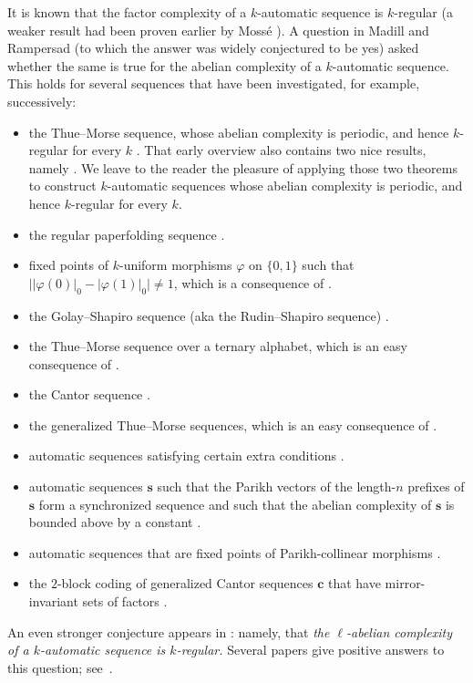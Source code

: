 \documentclass[12pt]{article}
\theoremstyle{plain}
\theoremstyle{definition}
\theoremstyle{remark}
\numberwithin{equation}{section}
\begin{document}
It is known that the factor complexity of a $k$-automatic 
sequence is $k$-regular \cite[Prop.~4.3]{Carpi-D-Alonzo}
(a weaker result had been proven earlier by Moss\'e \cite{Mosse}).
A question in Madill and Rampersad \cite{MadillRampersad} (to which the answer 
was widely conjectured to be yes) asked whether the same 
is true for the abelian complexity of a $k$-automatic 
sequence.  
This holds for several sequences that 
have been investigated, for example, successively:
\begin{itemize}
    \item the Thue--Morse sequence, whose abelian complexity is periodic, and hence $k$-regular for every $k$ 
    \cite[Thm.~3.1]{Richomme&Saari&Zamboni:2011}. That
    early overview also contains two nice results, namely
    \cite[Thm.~1.7 and Thm.~3.3]{Richomme&Saari&Zamboni:2011}. We leave to the reader the
    pleasure of applying those two theorems to construct
    $k$-automatic sequences whose abelian complexity is
    periodic, and hence $k$-regular for every $k$.
    \item the regular paperfolding sequence \cite{MadillRampersad}.
    \item fixed points of $k$-uniform morphisms 
    $\varphi$ on $\{0, 1\}$ such that 
    $\big|\lvert\varphi(0)\rvert_0 - \lvert\varphi(1)\rvert_0\big|\neq 1$, which is a consequence of \cite[Cor.~1]{BSSW}.
    \item the Golay--Shapiro sequence (aka the Rudin--Shapiro sequence) \cite{LCWW}.
    \item the Thue--Morse sequence over a ternary alphabet, which is an easy consequence of \cite[Thm.~4.1]{KaboreKentiega}.
    \item the Cantor sequence \cite[Thm.~2]{CLW}.
    \item the generalized Thue--Morse sequences, which is an easy consequence of \cite[Cor.~1]{ChenWen}.
    \item automatic sequences satisfying certain extra conditions
    \cite[Thm.~2]{ChenWen}.
    \item automatic sequences $\mathbf{s}$ such that
    the Parikh vectors of the length-$n$ prefixes of $\mathbf{s}$ 
    form a synchronized sequence and such that the abelian
    complexity of $\mathbf{s}$ is bounded above by a constant \cite{Shallit2021}.
    \item automatic sequences that are fixed points of Parikh-collinear morphisms \cite[Thm.~3]{Rigo&Stipulanti&Whiteland:2024}.
    \item the $2$-block coding of generalized Cantor 
    sequences $\mathbf{c}$ that have mirror-invariant sets of 
    factors \cite[Thm.~1]{LCW}.
    \end{itemize}
An even stronger conjecture appears in \cite{PRRV}: 
namely, that {\it the $\ell$-abelian complexity of a $k$-automatic 
sequence is $k$-regular.} Several papers give positive answers to this question; see~\cite{CLW,Couvreur2025,Greinecker,LCW,PRRV}.
\end{document}
